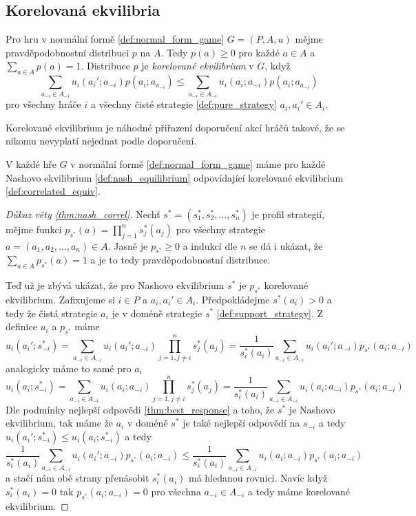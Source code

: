 \subsection{Korelovaná ekvilibria}
\begin{definition}
\label{def:correlated_equiv}
Pro hru v normální formě \ref{def:normal_form_game} $G=(P,A,u)$ mějme pravděpodobnostní distribuci $p$ na $A$. 
Tedy $p(a) \geq 0$ pro každé $a \in A$ a $\sum_{a\in A} p(a) = 1$. 
Distribuce $p$ je \textit{korelované ekvilibrium} v $G$, když 
$$ 
\sum_{a_{-i} \in A_{-i}} u_i(a_i'; a_{-i}) p(a_i; a_{a_{-i}}) \leq \sum_{a_{-i} \in A_{-i}} u_i(a_i; a_{-i}) p(a_i; a_{a_{-i}})  
$$
pro všechny hráče $i$ a všechny čisté strategie \ref{def:pure_strategy} $a_i, a_i' \in A_i$.
\end{definition}
Korelované ekvilibrium je náhodné přiřazení doporučení akcí hráčů takové, že se nikomu nevyplatí nejednat podle doporučení. 

\begin{theorem}
\label{thm:nash_correl}
    V každé hře $G$ v normální formě \ref{def:normal_form_game} máme pro každé Nashovo ekvilibrium \ref{def:nash_equilibrium} odpovídající korelované ekvilibrium \ref{def:correlated_equiv}. 
\end{theorem}
\begin{proof}[Důkaz věty \ref{thm:nash_correl}]
    Nechť $s^* = (s^*_1, s^*_2, \dots, s^*_n)$ je profil strategií, mějme funkci $p_{s^*}(a) = \prod^n_{j=1} s_j^* (a_j)$ pro všechny strategie $a = (a_1, a_2, \dots, a_n) \in A$. 
    Jasně je $p_{s^*} \geq 0$ a indukcí dle $n$ se dá i ukázat, že $\sum_{a\in A} p_{s^*}(a) =1$ a je to tedy pravděpodobnostní distribuce. 

    Teď už je zbývá ukázat, že pro Nashovo ekvilibrium $s^*$ je $p_{s^*}$ korelované ekvilibrium. 
    Zafixujeme si $i \in P$ a $a_i, a_i' \in A_i$. Předpokládejme $s^*(a_i) > 0$ a tedy že čistá strategie $a_i$ je v doméně strategie $s^*$ \ref{def:support_strategy}. 
    Z definice $u_i$ a $p_{s^*}$ máme 
    $$ 
    u_i(a_i'; s^*_{-i}) = \sum_{a_{-i} \in A_{-i}} u_i(a_i'; a_{-i}) \prod_{j=1, j\neq i}^n s^*_j(a_j) = \frac{1}{s^*_i(a_i)} \sum_{a_{-i} \in A_{-i}} u_i(a_i'; a_{-i}) p_{s^*} (a_i; a_{-i})
    $$
    analogicky máme to samé pro $a_i$
    $$ 
    u_i(a_i; s^*_{-i}) = \sum_{a_{-i} \in A_{-i}} u_i(a_i; a_{-i}) \prod_{j=1, j\neq i}^n s^*_j(a_j) = \frac{1}{s^*_i(a_i)} \sum_{a_{-i} \in A_{-i}} u_i(a_i; a_{-i}) p_{s^*} (a_i; a_{-i})
    $$
    Dle podmínky nejlepší odpovědi \ref{thm:best_response} a toho, že $s^*$ je Nashovo ekvilibrium, tak máme že $a_i$ v doméně $s^*$ je také nejlepší odpovědí na $s_{-i}$ a tedy $u_i(a_i'; s^*_{-i}) \leq u_i(a_i; s^*_{-i})$ a tedy 
    $$ 
    \frac{1}{s^*_i(a_i)} \sum_{a_{-i} \in A_{-i}} u_i(a_i'; a_{-i}) p_{s^*} (a_i; a_{-i}) \leq \frac{1}{s^*_i(a_i)} \sum_{a_{-i} \in A_{-i}} u_i(a_i; a_{-i}) p_{s^*} (a_i; a_{-i})
    $$ 
    a stačí nám obě strany přenásobit $s^*_i(a_i)$ má hledanou rovnici. 
    Navíc když $s^*_i(a_i) = 0$ tak $p_{s^*}(a_i; a_{-i}) = 0$ pro všechna $a_{-i} \in A_{-i}$ a tedy máme korelované ekvilibrium.
\end{proof}

